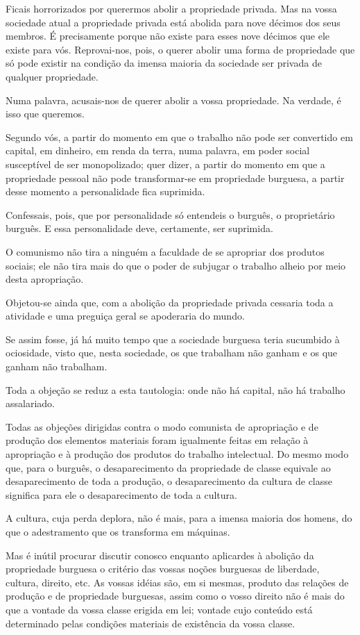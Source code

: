 Ficais horrorizados por querermos abolir a propriedade privada. Mas na
vossa sociedade atual a propriedade privada está abolida para nove
décimos dos seus membros. É precisamente porque não existe para esses
nove décimos que ele existe para vós. Reprovai-nos, pois, o querer
abolir uma forma de propriedade que só pode existir na condição da
imensa maioria da sociedade ser privada de qualquer propriedade.

Numa palavra, acusais-nos de querer abolir a vossa propriedade. Na
verdade, é isso que queremos.

Segundo vós, a partir do momento em que o trabalho não pode ser
convertido em capital, em dinheiro, em renda da terra, numa palavra,
em poder social susceptível de ser monopolizado; quer dizer, a partir
do momento em que a propriedade pessoal não pode transformar-se em
propriedade burguesa, a partir desse momento a personalidade fica
suprimida.

Confessais, pois, que por personalidade só entendeis o burguês, o
proprietário burguês. E essa personalidade deve, certamente, ser
suprimida.

O comunismo não tira a ninguém a faculdade de se apropriar dos
produtos sociais; ele não tira mais do que o poder de subjugar o
trabalho alheio por meio desta apropriação.

Objetou-se ainda que, com a abolição da propriedade privada cessaria
toda a atividade e uma preguiça geral se apoderaria do mundo.

Se assim fosse, já há muito tempo que a sociedade burguesa teria
sucumbido à ociosidade, visto que, nesta sociedade, os que trabalham
não ganham e os que ganham não trabalham.

Toda a objeção se reduz a esta tautologia: onde não há capital, não há
trabalho assalariado.

Todas as objeções dirigidas contra o modo comunista de apropriação e
de produção dos elementos materiais foram igualmente feitas em relação
à apropriação e à produção dos produtos do trabalho intelectual. Do
mesmo modo que, para o burguês, o desaparecimento da propriedade de
classe equivale ao desaparecimento de toda a produção, o
desaparecimento da cultura de classe significa para ele o
desaparecimento de toda a cultura.

A cultura, cuja perda deplora, não é mais, para a imensa maioria dos
homens, do que o adestramento que os transforma em máquinas.

Mas é inútil procurar discutir conosco enquanto aplicardes à abolição
da propriedade burguesa o critério das vossas noções burguesas de
liberdade, cultura, direito, etc. As vossas idéias são, em si mesmas,
produto das relações de produção e de propriedade burguesas, assim
como o vosso direito não é mais do que a vontade da vossa classe
erigida em lei; vontade cujo conteúdo está determinado pelas condições
materiais de existência da vossa classe.

